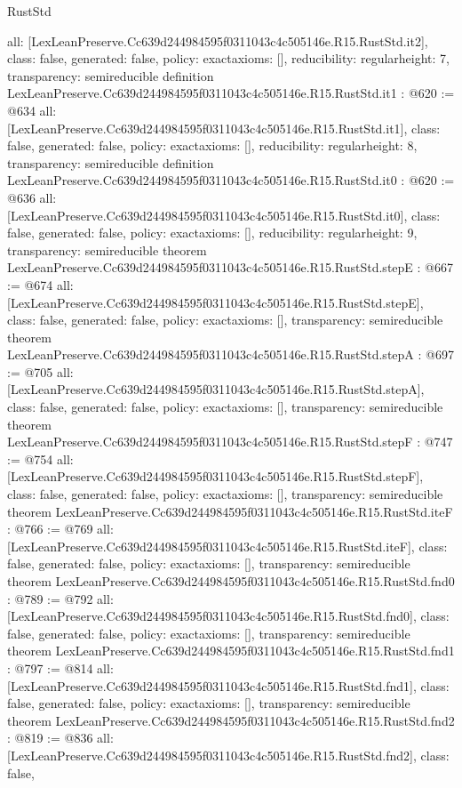 \begin{lexlean}{RustStd}
\begin{coremodule}
{  all: [LexLeanPreserve.Cc639d244984595f0311043c4c505146e.R15.RustStd.it2],
  class: false,
  generated: false,
  policy: exact{axioms: []},
  reducibility: regular{height: 7},
  transparency: semireducible
}
definition LexLeanPreserve.Cc639d244984595f0311043c4c505146e.R15.RustStd.it1 : @620 := @634 {
  all: [LexLeanPreserve.Cc639d244984595f0311043c4c505146e.R15.RustStd.it1],
  class: false,
  generated: false,
  policy: exact{axioms: []},
  reducibility: regular{height: 8},
  transparency: semireducible
}
definition LexLeanPreserve.Cc639d244984595f0311043c4c505146e.R15.RustStd.it0 : @620 := @636 {
  all: [LexLeanPreserve.Cc639d244984595f0311043c4c505146e.R15.RustStd.it0],
  class: false,
  generated: false,
  policy: exact{axioms: []},
  reducibility: regular{height: 9},
  transparency: semireducible
}
theorem LexLeanPreserve.Cc639d244984595f0311043c4c505146e.R15.RustStd.stepE : @667 := @674 {
  all: [LexLeanPreserve.Cc639d244984595f0311043c4c505146e.R15.RustStd.stepE],
  class: false,
  generated: false,
  policy: exact{axioms: []},
  transparency: semireducible
}
theorem LexLeanPreserve.Cc639d244984595f0311043c4c505146e.R15.RustStd.stepA : @697 := @705 {
  all: [LexLeanPreserve.Cc639d244984595f0311043c4c505146e.R15.RustStd.stepA],
  class: false,
  generated: false,
  policy: exact{axioms: []},
  transparency: semireducible
}
theorem LexLeanPreserve.Cc639d244984595f0311043c4c505146e.R15.RustStd.stepF : @747 := @754 {
  all: [LexLeanPreserve.Cc639d244984595f0311043c4c505146e.R15.RustStd.stepF],
  class: false,
  generated: false,
  policy: exact{axioms: []},
  transparency: semireducible
}
theorem LexLeanPreserve.Cc639d244984595f0311043c4c505146e.R15.RustStd.iteF : @766 := @769 {
  all: [LexLeanPreserve.Cc639d244984595f0311043c4c505146e.R15.RustStd.iteF],
  class: false,
  generated: false,
  policy: exact{axioms: []},
  transparency: semireducible
}
theorem LexLeanPreserve.Cc639d244984595f0311043c4c505146e.R15.RustStd.fnd0 : @789 := @792 {
  all: [LexLeanPreserve.Cc639d244984595f0311043c4c505146e.R15.RustStd.fnd0],
  class: false,
  generated: false,
  policy: exact{axioms: []},
  transparency: semireducible
}
theorem LexLeanPreserve.Cc639d244984595f0311043c4c505146e.R15.RustStd.fnd1 : @797 := @814 {
  all: [LexLeanPreserve.Cc639d244984595f0311043c4c505146e.R15.RustStd.fnd1],
  class: false,
  generated: false,
  policy: exact{axioms: []},
  transparency: semireducible
}
theorem LexLeanPreserve.Cc639d244984595f0311043c4c505146e.R15.RustStd.fnd2 : @819 := @836 {
  all: [LexLeanPreserve.Cc639d244984595f0311043c4c505146e.R15.RustStd.fnd2],
  class: false,
}
\end{coremodule}
\end{lexlean}
